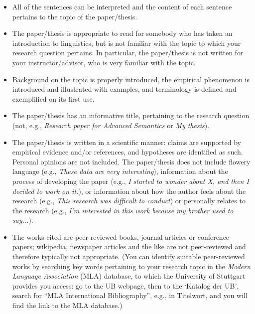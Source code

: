 \documentclass[11pt,fleqn,a4paper/thesis]{article}
\newcommand{\6}{\mbox{$[\hspace*{-.6mm}[$}}
\newcommand{\9}{\mbox{$]\hspace*{-.6mm}]$}}
\begin{document}
\begin{itemize}[itemsep=-1pt,leftmargin=2.5ex,topsep=-2pt]

\item All of the sentences can be interpreted and the content of each sentence pertains to the topic of the paper/thesis.

\item The paper/thesis is appropriate to read for somebody who has taken an introduction to linguistics, but is not familiar with the topic to which your research question pertains. In particular, the paper/thesis is not written for your instructor/advisor, who is very familiar with the topic.

\item Background on the topic is properly introduced, the empirical phenomenon is introduced and illustrated with examples, and terminology is defined and exemplified on its first use. 

\item The paper/thesis has an informative title, pertaining to the research question (not, e.g., {\em Research paper for Advanced Semantics} or {\em My thesis}).

\item The paper/thesis is written in a scientific manner: claims are supported by empirical evidence and/or references, and hypotheses are identified as such. Personal opinions are not included. The paper/thesis does not include flowery language (e.g., {\em These data are very interesting}), information about the process of developing the paper (e.g., {\em I started to wonder about X, and then I decided to work on it.}), or information about how the author feels about the research (e.g., {\em This research was difficult to conduct}) or personally relates to the research (e.g., {\em I'm interested in this work because my brother used to say...}).

\item The works cited are peer-reviewed books, journal articles or conference papers; wikipedia, newspaper articles and the like are not peer-reviewed and therefore typically not appropriate. (You can identify suitable peer-reviewed works by searching key words pertaining to your research topic in the {\em Modern Language Association} (MLA) database, to which the University of Stuttgart provides you access: go to the UB webpage, then to the `Katalog  der UB', search for ``MLA International Bibliography'', e.g., in Titelwort, and you will find the link to the MLA database.)


\end{itemize}
\end{document}
